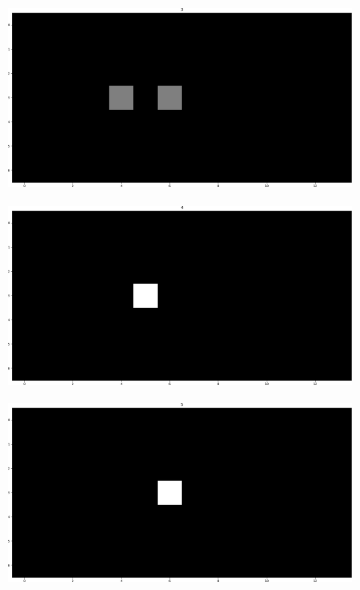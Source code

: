 \documentclass[runningheads]{llncs}
\begin{document}
\begin{figure}
	\begin{subfigure}[b]{0.32\textwidth}
		\centering
		\includegraphics[width=\textwidth]{imgs/prediction_default_lab/it_03.png}
		\caption{}
		\label{fig:localization_step3}
	\end{subfigure}
	\begin{subfigure}[b]{0.32\textwidth}
		\centering
		\includegraphics[width=\textwidth]{imgs/prediction_default_lab/it_04.png}
		\caption{}
		\label{fig:localization_step4}
	\end{subfigure}
	\begin{subfigure}[b]{0.32\textwidth}
		\centering
		\includegraphics[width=\textwidth]{imgs/prediction_default_lab/it_05.png}
		\caption{}
		\label{fig:localization_step5}
	\end{subfigure}
	

\end{figure}
\end{document}
